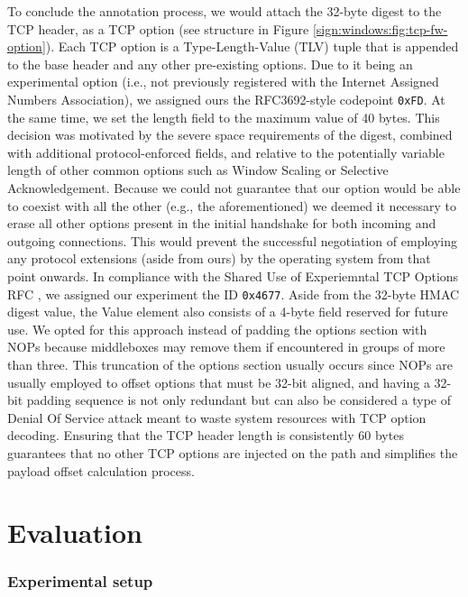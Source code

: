 To conclude the annotation process, we would attach the 32-byte digest to the TCP header, as a TCP option (see structure in Figure \ref{sign:windows:fig:tcp-fw-option}). Each TCP option is a Type-Length-Value (TLV) tuple that is appended to the base header and any other pre-existing options. Due to it being an experimental option (i.e., not previously registered with the Internet Assigned Numbers Association), we assigned ours the RFC3692-style \cite{rfc3692} codepoint \texttt{0xFD}. At the same time, we set the length field to the maximum value of 40 bytes. This decision was motivated by the severe space requirements of the digest, combined with additional protocol-enforced fields, and relative to the potentially variable length of other common options such as Window Scaling or Selective Acknowledgement. Because we could not guarantee that our option would be able to coexist with all the other (e.g., the aforementioned) we deemed it necessary to erase all other options present in the initial handshake for both incoming and outgoing connections. This would prevent the successful negotiation of employing any protocol extensions (aside from ours) by the operating system from that point onwards. In compliance with the Shared Use of Experiemntal TCP Options RFC \cite{rfc6994}, we assigned our experiment the ID \texttt{0x4677}. Aside from the 32-byte HMAC digest value, the Value element also consists of a 4-byte field reserved for future use. We opted for this approach instead of padding the options section with NOPs because middleboxes may remove them if encountered in groups of more than three. This truncation of the options section usually occurs since NOPs are usually employed to offset options that must be 32-bit aligned, and having a 32-bit padding sequence is not only redundant but can also be considered a type of Denial Of Service attack meant to waste system resources with TCP option decoding. Ensuring that the TCP header length is consistently 60 bytes guarantees that no other TCP options are injected on the path and simplifies the payload offset calculation process.

\section{Evaluation}
\label{sign:windows:evaluation}

\subsubsection{Experimental setup}
\label{sign:windows:evaluation:setup}

